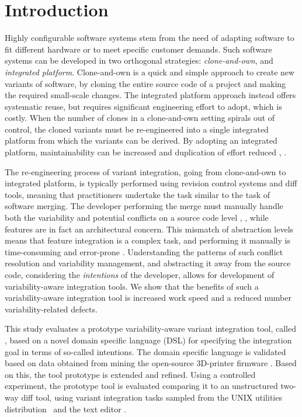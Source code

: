 \chapter{Introduction}
Highly configurable software systems stem from the need of adapting software to fit different hardware or to meet specific customer demands. Such software systems can be developed in two orthogonal strategies: \textit{clone-and-own}, and \textit{integrated platform}. Clone-and-own is a quick and simple approach to create new variants of software, by cloning the entire source code of a project and making the required small-scale changes. The integrated platform approach instead offers systematic reuse, but requires significant engineering effort to adopt, which is costly. When the number of clones in a clone-and-own setting spirals out of control, the cloned variants must be re-engineered into a single integrated platform from which the variants can be derived. By adopting an integrated platform, maintainability can be increased and duplication of effort reduced \cite{schmorleiz2016similarity}, \cite{stanciulescu2015}.

The re-engineering process of variant integration, going from clone-and-own to integrated platform, is typically performed using revision control systems and diff tools, meaning that practitioners undertake the task similar to the task of software merging. The developer performing the merge must manually handle both the variability and potential conflicts on a source code level \cite{mens2002}, \cite{apel2011}, while features are in fact an architectural concern. This mismatch of abstraction levels means that feature integration is a complex task, and performing it manually is time-consuming and error-prone \cite{melo2016latin}. Understanding the patterns of such conflict resolution and variability management, and abstracting it away from the source code, considering the \textit{intentions} of the developer, allows for development of variability-aware integration tools. We show that the benefits of such a variability-aware integration tool is increased work speed and a reduced number variability-related defects.

This study evaluates a prototype variability-aware variant integration tool, called \tooln, based on a novel domain specific language (DSL) for specifying the integration goal in terms of so-called intentions.
The domain specific language is validated based on data obtained from mining the open-source 3D-printer firmware \marlin. Based on this, the tool prototype is extended and refined. Using a controlled experiment, the prototype tool is evaluated comparing it to an unstructured two-way diff tool, using variant integration tasks sampled from the UNIX utilities distribution \busybox~and the text editor \vim.


